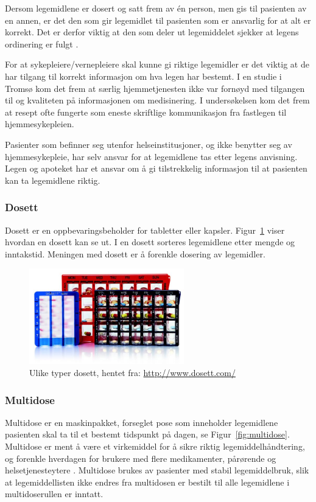 Dersom legemidlene er dosert og satt frem av én person, men gis til pasienten av en annen, er det den som gir legemidlet til pasienten som er ansvarlig for at alt er korrekt. Det er derfor viktig at den som deler ut legemiddelet sjekker at legens ordinering er fulgt \citep{IllustrertFarmakologi}. 

For at sykepleiere/vernepleiere skal kunne gi riktige legemidler er det viktig at de har tilgang til korrekt informasjon om hva legen har bestemt. I en studie i Tromsø \citep{komLegemidler} kom det frem at særlig hjemmetjenesten ikke var fornøyd med tilgangen til og kvaliteten på informasjonen om medisinering. I undersøkelsen kom det frem at resept ofte fungerte som eneste skriftlige kommunikasjon fra fastlegen til hjemmesykepleien. 

Pasienter som befinner seg utenfor helseinstitusjoner, og ikke benytter seg av hjemmesykepleie, har selv ansvar for at legemidlene tas etter legens anvisning. Legen og apoteket har et ansvar om å gi tilstrekkelig informasjon til at pasienten kan ta legemidlene riktig. 

\subsubsection{Dosett}
Dosett er en oppbevaringsbeholder for tabletter eller kapsler. Figur~\ref{fig:dosett} viser hvordan en dosett kan se ut. I en dosett sorteres legemidlene etter mengde og inntakstid. Meningen med dosett er å forenkle dosering av legemidler.

\begin{figure}[h]
    \centering
    \includegraphics[width=0.6\textwidth]{fig/dagens/dosett.jpg}
    \caption{Ulike typer dosett, hentet fra: \url{http://www.dosett.com/}}
    \label{fig:dosett}
\end{figure}

\subsubsection{Multidose}
Multidose er en maskinpakket, forseglet pose som inneholder legemidlene pasienten skal ta til et bestemt tidspunkt på dagen, se Figur~\ref{fig:multidose}. Multidose er ment å være et virkemiddel for å sikre riktig legemiddelhåndtering, og forenkle hverdagen for brukere med flere medikamenter, pårørende og helsetjenesteytere \citep{OmMultidose}. Multidose brukes av pasienter med stabil legemiddelbruk, slik at legemiddellisten ikke endres fra multidosen er bestilt til alle legemidlene i multidoserullen er inntatt. 

